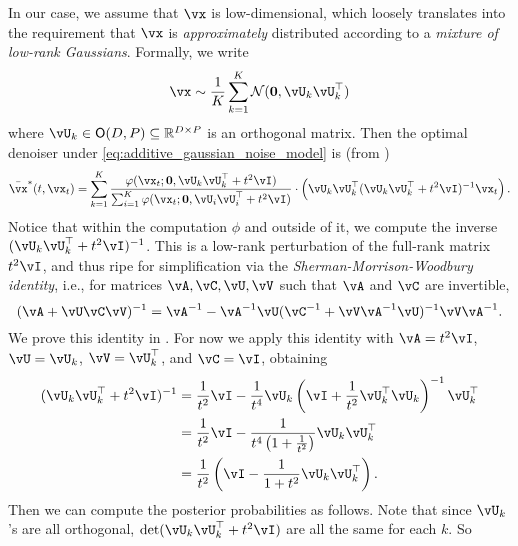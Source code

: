\documentclass[../../book-main.tex]{subfiles}
\begin{document}
In our case, we assume that \(\vx\) is low-dimensional, which loosely translates into the requirement that \(\vx\) is \textit{approximately} distributed according to a \textit{mixture of low-rank Gaussians}. Formally, we write 
\begin{equation}\label{eq:MoG1}
	\vx \sim \frac{1}{K}\sum_{k = 1}^{K}\dNorm(\vzero, \vU_{k}\vU_{k}^{\top})
\end{equation}
where \(\vU_{k} \in \O(D, P) \subseteq \R^{D \times P}\) is an orthogonal matrix. Then the optimal denoiser under \eqref{eq:additive_gaussian_noise_model} is (from )
\begin{equation}
	\bar{\vx}^{\ast}(t, \vx_{t}) = \sum_{k = 1}^{K}\frac{\phi(\vx_{t} ; \vzero,
	\vU_{k}\vU_{k}^{\top} + t^{2}\vI)}{\sum_{i = 1}^{K}\phi(\vx_{t} ; \vzero, \vU_{i}\vU_{i}^{\top} + t^{2}\vI)}\cdot\bp{\vU_{k}\vU_{k}^{\top}(\vU_{k}\vU_{k}^{\top} + t^{2}\vI)^{-1}\vx_{t}}.
\end{equation}
Notice that within the computation \(\phi\) and outside of it, we compute the inverse \((\vU_{k}\vU_{k}^{\top} + t^{2}\vI)^{-1}\). This is a low-rank perturbation of the full-rank matrix \(t^{2}\vI\), and thus ripe for simplification via the \textit{Sherman-Morrison-Woodbury identity}, i.e., for matrices \(\vA, \vC, \vU, \vV\) such that \(\vA\) and \(\vC\) are invertible,
\begin{equation}\label{eq:sherman_morrison_woodbury}
	(\vA + \vU\vC\vV)^{-1} = \vA^{-1} - \vA^{-1}\vU(\vC^{-1} + \vV\vA^{-1}\vU)^{-1}\vV\vA^{-1}.
\end{equation}
We prove this identity in . For now we apply this identity with \(\vA = t^{2}\vI\), \(\vU = \vU_{k}\), \(\vV = \vU_{k}^{\top}\), and \(\vC = \vI\), obtaining
\begin{align}
	(\vU_{k}\vU_{k}^{\top} + t^{2}\vI)^{-1} 
	&= \frac{1}{t^{2}}\vI - \frac{1}{t^{4}}\vU_{k}\bp{\vI + \frac{1}{t^{2}}\vU_{k}^{\top}\vU_{k}}^{-1}\vU_{k}^{\top} \\
	&= \frac{1}{t^{2}}\vI - \frac{1}{t^{4}\bp{1 + \frac{1}{t^{2}}}}\vU_{k}\vU_{k}^{\top} \\
	&= \frac{1}{t^{2}}\bp{\vI - \frac{1}{1 + t^{2}}\vU_{k}\vU_{k}^{\top}}.
\end{align}
Then we can compute the posterior probabilities as follows. Note that since \(\vU_{k}\)'s are all orthogonal, \(\det(\vU_{k}\vU_{k}^{\top} + t^{2}\vI)\) are all the same for each \(k\). So
\end{document}
